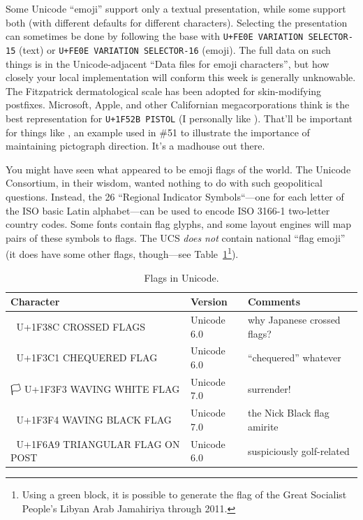 Some Unicode ``emoji'' support only a textual presentation, while some
support both (with different defaults for different characters). Selecting
the presentation can sometimes be done by following the base with \texttt{U+FE0E VARIATION SELECTOR-15} (text)
or \texttt{U+FE0E VARIATION SELECTOR-16} (emoji). The full data on such things
is in the Unicode-adjacent ``Data files for emoji characters'', but how closely
your local implementation will conform this week is generally unknowable. The
Fitzpatrick dermatological scale has been adopted for skin-modifying postfixes.
Microsoft, Apple, and other Californian megacorporations think
 is the best representation for
 \texttt{U+1F52B PISTOL} (I personally like
). That'll be important for things like
{}, an example used in \#51 to illustrate the
importance of maintaining pictograph direction. It's a madhouse out there.

You might have seen what appeared to be emoji flags of the world. The Unicode
Consortium, in their wisdom, wanted nothing to do with such geopolitical
questions. Instead, the 26 ``Regional Indicator Symbols``---one for each
letter of the ISO basic Latin alphabet\cite{iso646}---can be used to encode
ISO 3166-1\cite{iso3166} two-letter country codes\cite{darkcorners}. Some fonts contain flag
glyphs, and some layout engines will map pairs of these symbols to flags. The
UCS \textit{does not} contain national ``flag emoji'' (it does have some other
flags, though---see Table~\ref{table:flags}\footnote{Using a green block,
it is possible to generate the flag of the Great Socialist People's Libyan Arab Jamahiriya through 2011.}).

\begin{table}[!htb]
  \centering
  \begin{tabular}{|l|l|l|}
  \hline
  Character & Version & Comments \\
  \hline
  \hline
  🎌 U+1F38C CROSSED FLAGS & Unicode 6.0 & why Japanese crossed flags? \\
  \hline
  🏁 U+1F3C1 CHEQUERED FLAG & Unicode 6.0 & ``chequered'' whatever \\
  \hline
  🏳 U+1F3F3 WAVING WHITE FLAG & Unicode 7.0 & surrender! \\
  \hline
  🏴  U+1F3F4 WAVING BLACK FLAG & Unicode 7.0 & the Nick Black flag amirite \\
  \hline
  🚩 U+1F6A9 TRIANGULAR FLAG ON POST & Unicode 6.0 & suspiciously golf-related \\
  \hline
  \end{tabular}
  \caption{Flags in Unicode.}
  \label{table:flags}
\end{table}

